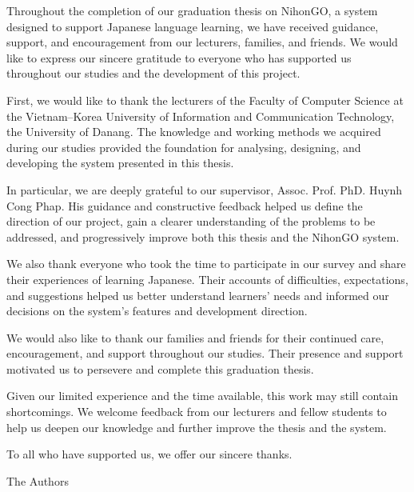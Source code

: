 {}

Throughout the completion of our graduation thesis on NihonGO, a system designed to support Japanese language learning, we have received guidance, support, and encouragement from our lecturers, families, and friends. We would like to express our sincere gratitude to everyone who has supported us throughout our studies and the development of this project.

First, we would like to thank the lecturers of the Faculty of Computer Science at the Vietnam--Korea University of Information and Communication Technology, the University of Danang. The knowledge and working methods we acquired during our studies provided the foundation for analysing, designing, and developing the system presented in this thesis.

In particular, we are deeply grateful to our supervisor, Assoc. Prof. PhD. Huynh Cong Phap. His guidance and constructive feedback helped us define the direction of our project, gain a clearer understanding of the problems to be addressed, and progressively improve both this thesis and the NihonGO system.

We also thank everyone who took the time to participate in our survey and share their experiences of learning Japanese. Their accounts of difficulties, expectations, and suggestions helped us better understand learners' needs and informed our decisions on the system's features and development direction.

We would also like to thank our families and friends for their continued care, encouragement, and support throughout our studies. Their presence and support motivated us to persevere and complete this graduation thesis.

Given our limited experience and the time available, this work may still contain shortcomings. We welcome feedback from our lecturers and fellow students to help us deepen our knowledge and further improve the thesis and the system.

To all who have supported us, we offer our sincere thanks.

\vspace{1.5cm}
\begin{flushright}
  \begin{minipage}{0.5\textwidth}
    \centering
    The Authors\\[1.2cm]
    \textbf{\StudentOne}\\[2pt]
    \textbf{\StudentTwo}
  \end{minipage}
\end{flushright}
